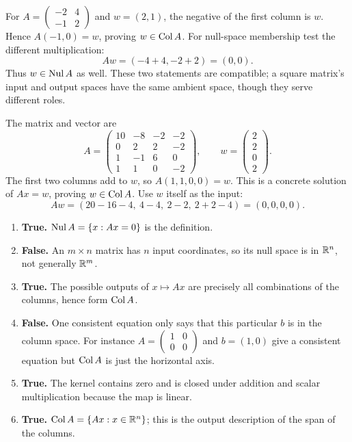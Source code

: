 For $A=\left(\begin{smallmatrix}-2&4\\-1&2\end{smallmatrix}\right)$ and
$w=(2,1)$, the negative of the first column is $w$. Hence
$A(-1,0)=w$, proving $w\in\operatorname{Col} A$.
For null-space membership test the different multiplication:
\[
 Aw=(-4+4,-2+2)=(0,0).
\]
Thus $w\in\operatorname{Nul} A$ as well. These two statements are compatible; a square
matrix's input and output spaces have the same ambient space, though they
serve different roles.

The matrix and vector are
\[
 A=\begin{pmatrix}10&-8&-2&-2\\0&2&2&-2\\1&-1&6&0\\1&1&0&-2\end{pmatrix},
 \qquad w=\begin{pmatrix}2\\2\\0\\2\end{pmatrix}.
\]
The first two columns add to $w$, so $A(1,1,0,0)=w$.
This is a concrete solution of $Ax=w$, proving $w\in\operatorname{Col} A$.
Use $w$ itself as the input:
\[
 Aw=(20-16-4,\ 4-4,\ 2-2,\ 2+2-4)=(0,0,0,0).
\]

\begin{enumerate}[label=(\alph*)]
\item \textbf{True.} $\operatorname{Nul} A=\{x:Ax=0\}$ is the definition.
\item \textbf{False.} An $m\times n$ matrix has $n$ input coordinates,
so its null space is in $\mathbb{R}^n$, not generally $\mathbb{R}^m$.
\item \textbf{True.} The possible outputs of $x\mapsto Ax$ are precisely
all combinations of the columns, hence form $\operatorname{Col} A$.
\item \textbf{False.} One consistent equation only says that this particular
$b$ is in the column space. For instance $A=\left(\begin{smallmatrix}1&0\\0&0\end{smallmatrix}\right)$
and $b=(1,0)$ give a consistent equation but $\operatorname{Col} A$ is just the horizontal axis.
\item \textbf{True.} The kernel contains zero and is closed under addition
and scalar multiplication because the map is linear.
\item \textbf{True.} $\operatorname{Col} A=\{Ax:x\in\mathbb{R}^n\}$; this is the output description
of the span of the columns.
\end{enumerate}

